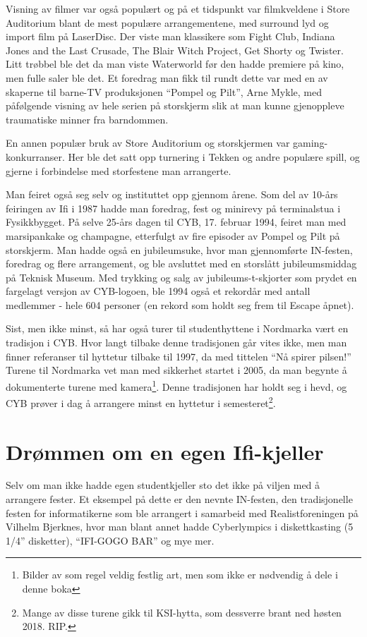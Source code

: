 Visning av filmer var også populært og på et tidspunkt var filmkveldene i Store Auditorium blant de mest populære arrangementene, med surround lyd og import film på LaserDisc. Der viste man klassikere som Fight Club, Indiana Jones and the Last Crusade, The Blair Witch Project, Get Shorty og Twister. Litt trøbbel ble det da man viste Waterworld før den hadde premiere på kino, men fulle saler ble det. Et foredrag man fikk til rundt dette var med en av skaperne til barne-TV produksjonen ``Pompel og Pilt'', Arne Mykle, med påfølgende visning av hele serien på storskjerm slik at man kunne gjenoppleve traumatiske minner fra barndommen.

En annen populær bruk av Store Auditorium og storskjermen var gaming-konkurranser. Her ble det satt opp turnering i Tekken og andre populære spill, og gjerne i forbindelse med storfestene man arrangerte.

Man feiret også seg selv og instituttet opp gjennom årene. Som del av 10-års feiringen av Ifi i 1987 hadde man foredrag, fest og minirevy på terminalstua i Fysikkbygget. På selve 25-års dagen til CYB, 17. februar 1994, feiret man med marsipankake og champagne, etterfulgt av fire episoder av Pompel og Pilt på storskjerm. Man hadde også en jubileumsuke, hvor man gjennomførte IN-festen, foredrag og flere arrangement, og ble avsluttet med en storslått jubileumsmiddag på Teknisk Museum. Med trykking og salg av jubileums-t-skjorter som prydet en fargelagt versjon av CYB-logoen, ble 1994 også et rekordår med antall medlemmer - hele 604 personer (en rekord som holdt seg frem til Escape åpnet).

Sist, men ikke minst, så har også turer til studenthyttene i Nordmarka vært en tradisjon i CYB. Hvor langt tilbake denne tradisjonen går vites ikke, men man finner referanser til hyttetur tilbake til 1997, da med tittelen ``Nå spirer pilsen!'' Turene til Nordmarka vet man med sikkerhet startet i 2005, da man begynte å dokumenterte turene med kamera\footnote{Bilder av som regel veldig festlig art, men som ikke er nødvendig å dele i denne boka}. Denne tradisjonen har holdt seg i hevd, og CYB prøver i dag å arrangere minst en hyttetur i semesteret\footnote{Mange av disse turene gikk til KSI-hytta, som dessverre brant ned høsten 2018. RIP.}.

\section{Drømmen om en egen Ifi-kjeller}

Selv om man ikke hadde egen studentkjeller sto det ikke på viljen med å arrangere fester. Et eksempel på dette er den nevnte IN-festen, den tradisjonelle festen for informatikerne som ble arrangert i samarbeid med Realistforeningen på Vilhelm Bjerknes, hvor man blant annet hadde Cyberlympics i diskettkasting (5 1/4'' disketter), ``IFI-GOGO BAR'' og mye mer. 

